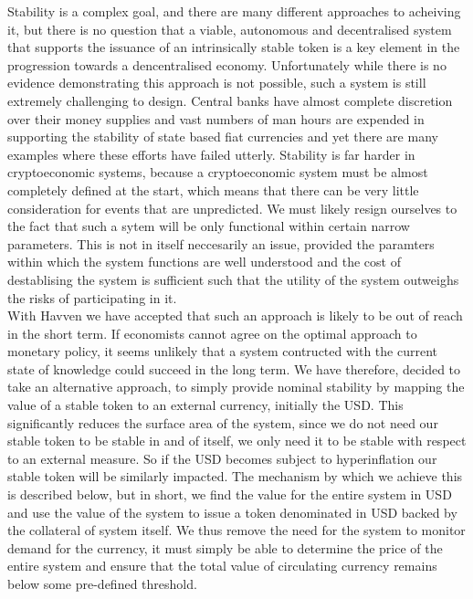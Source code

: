 \noindent Stability is a complex goal, and there are many different approaches to acheiving it, but there is no question that a viable, autonomous and decentralised system that supports the issuance of an intrinsically stable token is a key element in the progression towards a dencentralised economy. Unfortunately while there is no evidence demonstrating this approach is not possible, such a system is still extremely challenging to design. Central banks have almost complete discretion over their money supplies and vast numbers of man hours are expended in supporting the stability of state based fiat currencies and yet there are many examples where these efforts have failed utterly. Stability is far harder in cryptoeconomic systems, because a cryptoeconomic system must be almost completely defined at the start, which means that there can be very little consideration for events that are unpredicted. We must likely resign ourselves to the fact that such a sytem will be only functional within certain narrow parameters. This is not in itself neccesarily an issue, provided the paramters within which the system functions are well understood and the cost of destablising the system is sufficient such that the utility of the system outweighs the risks of participating in it. \\

\noindent With Havven we have accepted that such an approach is likely to be out of reach in the short term. If economists cannot agree on the optimal approach to monetary policy, it seems unlikely that a system contructed with the current state of knowledge could succeed in the long term. We have therefore, decided to take an alternative approach, to simply provide nominal stability by mapping the value of a stable token to an external currency, initially the USD. This significantly reduces the surface area of the system, since we do not need our stable token to be stable in and of itself, we only need it to be stable with respect to an external measure. So if the USD becomes subject to hyperinflation our stable token will be similarly impacted. The mechanism by which we achieve this is described below, but in short, we find the value for the entire system in USD and use the value of the system to issue a token denominated in USD backed by the collateral of system itself. We thus remove the need for the system to monitor demand for the currency, it must simply be able to determine the price of the entire system and ensure that the total value of circulating currency remains below some pre-defined threshold.\\

